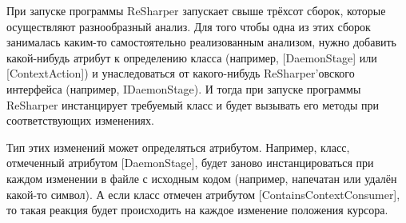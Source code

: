 При запуске программы ReSharper запускает свыше трёхсот сборок, которые осуществляют разнообразный анализ. Для того чтобы одна из этих сборок занималась каким-то самостоятельно реализованным анализом, нужно добавить какой-нибудь атрибут к определению класса (например, [DaemonStage] или [ContextAction]) и унаследоваться от какого-нибудь ReSharper’овского интерфейса (например, IDaemonStage). И тогда при запуске программы ReSharper инстанцирует требуемый класс и будет вызывать его методы при соответствующих изменениях. 

Тип этих изменений может определяться атрибутом. Например, класс, отмеченный атрибутом [DaemonStage], будет заново инстанцироваться при каждом изменении в файле с исходным кодом (например, напечатан или удалён какой-то символ). А если класс отмечен атрибутом [ContainsContextConsumer], то такая реакция будет происходить на каждое изменение положения курсора. 
